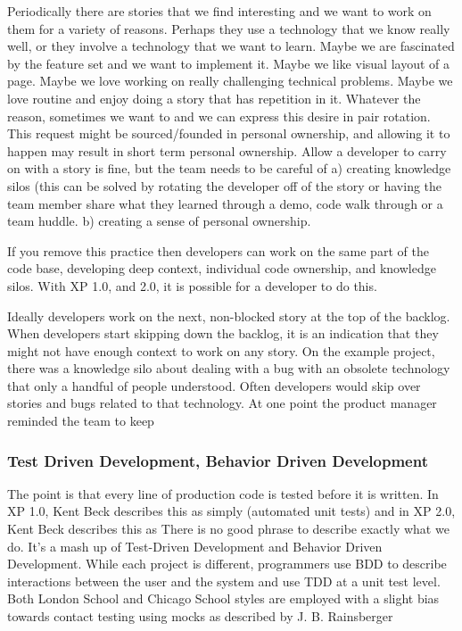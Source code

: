 Periodically there are stories that we find interesting and we want to work on them for a variety of reasons. Perhaps they use a technology that we know really well, or they involve a technology that we want to learn. Maybe we are fascinated by the feature set and we want to implement it. Maybe we like visual layout of a page. Maybe we love working on really challenging technical problems. Maybe we love routine and enjoy doing a story that has repetition in it. Whatever the reason, sometimes we want to  and we can express this desire in pair rotation. This request might be sourced/founded in personal ownership, and allowing it to happen may result in short term personal ownership. Allow a developer to carry on with a story is fine, but the team needs to be careful of a) creating knowledge silos (this can be solved by rotating the developer off of the story or having the team member share what they learned through a demo, code walk through or a team huddle. b) creating a sense of personal ownership.

If you remove this practice then developers can work on the same part of the code base, developing deep context, individual code ownership, and knowledge silos. With XP 1.0, and 2.0, it is possible for a developer to do this. 

Ideally developers work on the next, non-blocked story at the top of the backlog. When developers start skipping down the backlog, it is an indication that they might not have enough context to work on any story. On the example project, there was a knowledge silo about dealing with a bug with an obsolete technology that only a handful of people understood. Often developers would skip over stories and bugs related to that technology. At one point the product manager reminded the team to keep  


\subsubsection{Test Driven Development, Behavior Driven Development}
The point is that every line of production code is tested before it is written.
In XP 1.0, Kent Beck describes this as simply  (automated unit tests) and in XP 2.0, Kent Beck describes this as  There is no good phrase to describe exactly what we do. It's a mash up of Test-Driven Development and Behavior Driven Development. While each project is different, programmers use BDD to describe interactions between the user and the system and use TDD at a unit test level. Both London School and Chicago School styles are employed with a slight bias towards contact testing using mocks as described by J. B. Rainsberger \cite{RainsbergerIntegrationTestsYouTube}

